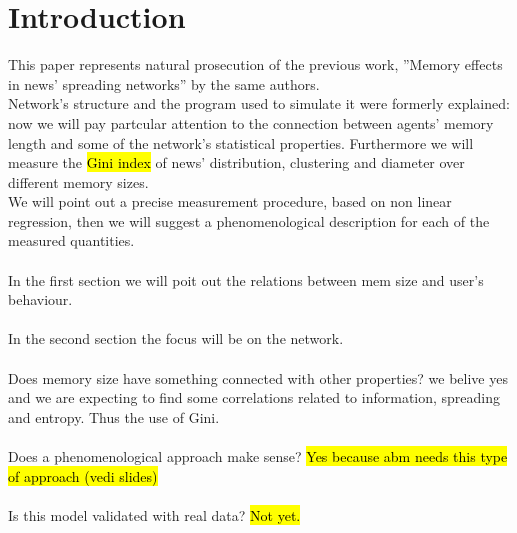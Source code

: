 \section{Introduction}
This paper represents natural prosecution of the previous work,
''Memory effects in news' spreading networks'' by the same authors.\\
Network's structure and the program used to simulate it were
formerly explained: now we will pay partcular attention to
the connection between agents' memory length  and some of the
network's statistical properties.
Furthermore we will measure the \hl{Gini index} of news' distribution,
clustering and diameter over different memory sizes.\\
We will point out a precise measurement procedure, based on non linear
regression, then we will suggest a phenomenological description for
each of the measured quantities.\\ \\
In the first section we will poit out the relations between mem size
and user's behaviour. \\ \\
In the second section the focus will be on the network.\\ \\
Does memory size have something connected with other properties?
we belive yes and we are expecting to find some correlations related
to information, spreading and entropy. Thus the use of Gini.\\ \\
Does a phenomenological approach make sense? \hl{Yes because abm needs
this type of approach (vedi slides)}\\ \\
Is this model validated with real data? \hl{Not yet.}